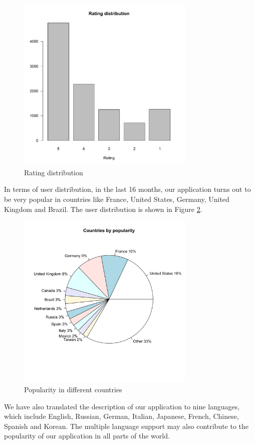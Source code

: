 \begin{figure}[!t]
\centering \includegraphics[height=8.5cm]{charts/rating_distribution}
\caption{Rating distribution\label{ratings}}
\end{figure}
In terms of user distribution, in the last 16 months, our application turns out
to be very popular in countries like France, United States, Germany, United Kingdom
and Brazil. The user distribution is shown in Figure \ref{user_country}.
\begin{figure}[htb]
\centering \includegraphics[height=8.5cm]{charts/country_popularity}
\caption{Popularity in different countries \label{user_country}}
\end{figure}
We have also translated the description of our application to nine languages, which include English, Russian, German, Italian, Japanese, French, Chinese, Spanish and Korean. The multiple language support may also contribute to the popularity of our application in all parts of the world.
